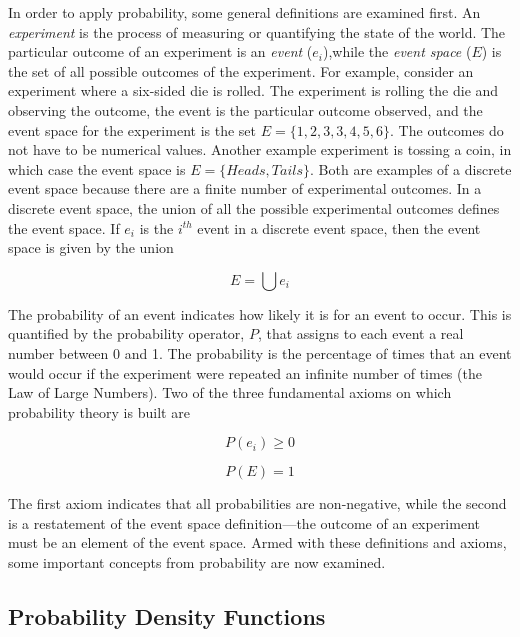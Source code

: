 {In order to apply probability, some general definitions are examined
first. An \emph{experiment} is the process of measuring or quantifying
the state of the world. The particular outcome of an experiment is an
\emph{event} ($e_i$),while the
\emph{event space} ($E$) is the set of all possible outcomes of the
experiment. For example, consider an experiment where a six-sided die is
rolled. The experiment is rolling the die and observing the outcome, the
event is the particular outcome observed, and the event space for the
experiment is the set $E = \{1,2,3,3,4,5,6\}$. The outcomes do not
have to be numerical values. Another example experiment is tossing a
coin, in which case the event space is $E=\{Heads, Tails\}$. Both
are examples of a discrete event space because there are a finite number
of experimental outcomes. In a discrete event space, the union of all
the possible experimental outcomes defines the event space. If
$e_i$ is the $i^{th}$
event in a discrete event space, then the event space is given by the
union

\begin{equation}
\label{eventSpaceUnion}
E = \bigcup e_i
\end{equation}

The probability of an event indicates how likely it is for an event to
occur. This is quantified by the probability operator, $P$, that
assigns to each event a real number between 0 and 1. The probability is
the percentage of times that an event would occur if the experiment were
repeated an infinite number of times (the Law of Large Numbers). Two of
the three fundamental axioms on which probability theory is built are

\begin{equation}
\label{equ:probabbilityGreaterEqualZero}
P(e_i)  \geq 0
\end{equation}

\begin{equation}
\label{equ:totalProbabilityEqualOne}
P(E)  = 1
\end{equation}

The first axiom indicates that all probabilities are non-negative, while
the second is a restatement of the event space definition---the outcome
of an experiment must be an element of the event space. Armed with these
definitions and axioms, some important concepts from probability are now
examined.

\subsection{Probability Density Functions}
\label{subsection:probability-density-functions}

}
